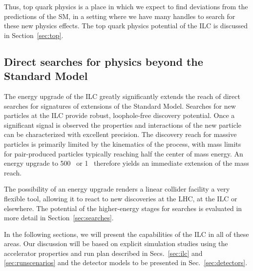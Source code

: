 Thus, top quark physics is a place in which we expect to find
deviations from the predictions of the SM, in a setting where we have
many handles to search for these new physics effects. The top quark
physics potential of the ILC is discussed in Section~\ref{sec:top}.



\subsection{Direct searches for physics beyond the Standard Model}

The energy upgrade of the ILC greatly significantly extends the reach of 
direct searches for signatures of extensions of the Standard Model. Searches
for new particles at the ILC provide robust, loophole-free
discovery potential. Once a significant signal is observed the properties and
interactions of the new particle can be characterized with excellent precision. 
The discovery reach for massive particles is 
primarily limited by the kinematics of the process, with mass limits for pair-produced particles typically reaching half the center of mass energy.
An energy upgrade to 500~\GeV{} or 1~\TeV{} therefore yields an immediate extension
of the mass reach. 

The possibility of an energy upgrade renders a linear collider facility a very 
flexible tool, allowing it to react to new discoveries at the LHC, at the ILC or
elsewhere. The potential of the higher-energy stages for searches is evaluated in 
more detail in Section~\ref{sec:searches}.

In the following sections, we will present the capabilities of the ILC
in all of these areas.  Our discussion will be based on 
explicit simulation studies using the accelerator properties
and run plan  described in Secs.~\ref{sec:ilc} and
\ref{sec:runscenarios} and the detector models to be presented
in  Sec.~\ref{sec:detectors}.